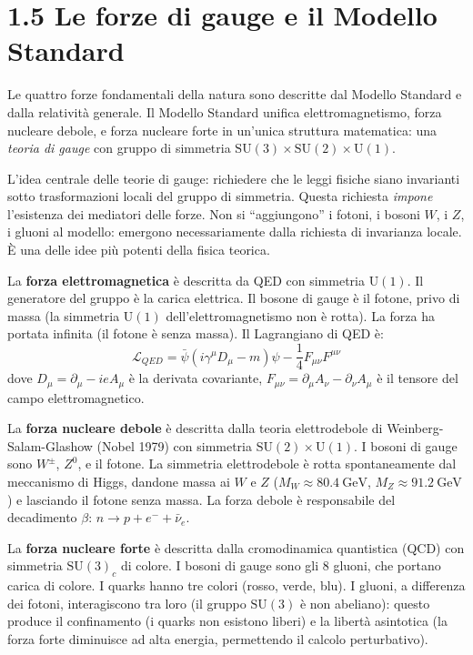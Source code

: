 \documentclass[11.5pt,a4paper,openany]{book}
\theoremstyle{remark}
\begin{document}
\section{1.5 Le forze di gauge e il Modello Standard}

Le quattro forze fondamentali della natura sono descritte dal Modello Standard e dalla relatività generale. Il Modello Standard unifica elettromagnetismo, forza nucleare debole, e forza nucleare forte in un'unica struttura matematica: una \textit{teoria di gauge} con gruppo di simmetria $\mathrm{SU}(3) \times \mathrm{SU}(2) \times \mathrm{U}(1)$.

L'idea centrale delle teorie di gauge: richiedere che le leggi fisiche siano invarianti sotto trasformazioni locali del gruppo di simmetria. Questa richiesta \textit{impone} l'esistenza dei mediatori delle forze. Non si ``aggiungono'' i fotoni, i bosoni $W$, i $Z$, i gluoni al modello: emergono necessariamente dalla richiesta di invarianza locale. È una delle idee più potenti della fisica teorica.

La \textbf{forza elettromagnetica} è descritta da QED con simmetria $\mathrm{U}(1)$. Il generatore del gruppo è la carica elettrica. Il bosone di gauge è il fotone, privo di massa (la simmetria $\mathrm{U}(1)$ dell'elettromagnetismo non è rotta). La forza ha portata infinita (il fotone è senza massa). Il Lagrangiano di QED è:
\[
\mathcal{L}_{QED} = \bar{\psi}(i\gamma^\mu D_\mu - m)\psi - \frac{1}{4}F_{\mu\nu}F^{\mu\nu}
\]
dove $D_\mu = \partial_\mu - ieA_\mu$ è la derivata covariante, $F_{\mu\nu} = \partial_\mu A_\nu - \partial_\nu A_\mu$ è il tensore del campo elettromagnetico.

La \textbf{forza nucleare debole} è descritta dalla teoria elettrodebole di Weinberg-Salam-Glashow (Nobel 1979) con simmetria $\mathrm{SU}(2) \times \mathrm{U}(1)$. I bosoni di gauge sono $W^\pm$, $Z^0$, e il fotone. La simmetria elettrodebole è rotta spontaneamente dal meccanismo di Higgs, dandone massa ai $W$ e $Z$ ($M_W \approx 80.4\ \text{GeV}$, $M_Z \approx 91.2\ \text{GeV}$) e lasciando il fotone senza massa. La forza debole è responsabile del decadimento $\beta$: $n \to p + e^- + \bar\nu_e$.

La \textbf{forza nucleare forte} è descritta dalla cromodinamica quantistica (QCD) con simmetria $\mathrm{SU}(3)_c$ di colore. I bosoni di gauge sono gli 8 gluoni, che portano carica di colore. I quarks hanno tre colori (rosso, verde, blu). I gluoni, a differenza dei fotoni, interagiscono tra loro (il gruppo $\mathrm{SU}(3)$ è non abeliano): questo produce il confinamento (i quarks non esistono liberi) e la libertà asintotica (la forza forte diminuisce ad alta energia, permettendo il calcolo perturbativo).
\end{document}

